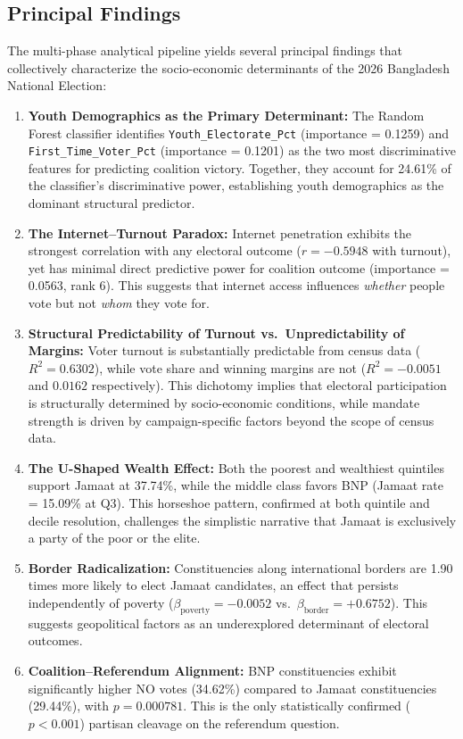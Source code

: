 \documentclass[12pt, a4paper]{article}
\begin{document}
\subsection{Principal Findings}

The multi-phase analytical pipeline yields several principal findings that collectively characterize the socio-economic determinants of the 2026 Bangladesh National Election:

\begin{enumerate}
    \item \textbf{Youth Demographics as the Primary Determinant:} The Random Forest classifier identifies \texttt{Youth\_Electorate\_Pct} (importance = 0.1259) and \texttt{First\_Time\_Voter\_Pct} (importance = 0.1201) as the two most discriminative features for predicting coalition victory. Together, they account for 24.61\% of the classifier's discriminative power, establishing youth demographics as the dominant structural predictor.

    \item \textbf{The Internet--Turnout Paradox:} Internet penetration exhibits the strongest correlation with any electoral outcome ($r = -0.5948$ with turnout), yet has minimal direct predictive power for coalition outcome (importance = 0.0563, rank 6). This suggests that internet access influences \emph{whether} people vote but not \emph{whom} they vote for.

    \item \textbf{Structural Predictability of Turnout vs.\ Unpredictability of Margins:} Voter turnout is substantially predictable from census data ($R^2 = 0.6302$), while vote share and winning margins are not ($R^2 = -0.0051$ and $0.0162$ respectively). This dichotomy implies that electoral participation is structurally determined by socio-economic conditions, while mandate strength is driven by campaign-specific factors beyond the scope of census data.

    \item \textbf{The U-Shaped Wealth Effect:} Both the poorest and wealthiest quintiles support Jamaat at 37.74\%, while the middle class favors BNP (Jamaat rate = 15.09\% at Q3). This horseshoe pattern, confirmed at both quintile and decile resolution, challenges the simplistic narrative that Jamaat is exclusively a party of the poor or the elite.

    \item \textbf{Border Radicalization:} Constituencies along international borders are 1.90 times more likely to elect Jamaat candidates, an effect that persists independently of poverty ($\beta_{\text{poverty}} = -0.0052$ vs.\ $\beta_{\text{border}} = +0.6752$). This suggests geopolitical factors as an underexplored determinant of electoral outcomes.

    \item \textbf{Coalition--Referendum Alignment:} BNP constituencies exhibit significantly higher NO votes (34.62\%) compared to Jamaat constituencies (29.44\%), with $p = 0.000781$. This is the only statistically confirmed ($p < 0.001$) partisan cleavage on the referendum question.
\end{enumerate}
\end{document}

